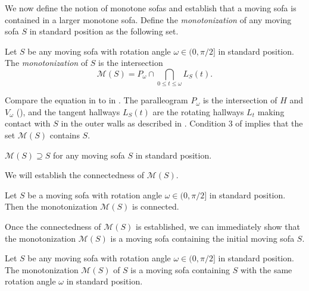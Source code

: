 We now define the notion of monotone sofas and establish  that a moving sofa is contained in a larger monotone sofa. Define the \emph{monotonization} of any moving sofa \(S\) in standard position as the following set.

\begin{definition}

Let \(S\) be any moving sofa with rotation angle \(\omega \in (0, \pi/2]\) in standard position. The \emph{monotonization} of \(S\) is the intersection
\[
\mathcal{M}(S) = P_\omega \cap \bigcap_{0 \leq t \leq \omega} L_S(t).
\]

\label{def:monotonization}
\end{definition}

Compare the equation in  to  in . The paralleogram \(P_\omega\) is the intersection of \(H\) and \(V_\omega\) (), and the tangent hallways \(L_S(t)\) are the rotating hallways \(L_t\) making contact with \(S\) in the outer walls as described in . Condition 3 of  implies that the set \(\mathcal{M}(S)\) contains \(S\).

\begin{corollary}

\(\mathcal{M}(S) \supseteq S\) for any moving sofa \(S\) in standard position.

\label{cor:monotonization-is-larger}
\end{corollary}

We will establish the connectedness of \(\mathcal{M}(S)\).

\begin{theorem}

Let \(S\) be a moving sofa with rotation angle \(\omega \in (0, \pi/2]\) in standard position. Then the monotonization \(\mathcal{M}(S)\) is connected.

\label{thm:monotonization-is-connected}
\end{theorem}

Once the connectedness of \(\mathcal{M}(S)\) is established, we can immediately show that the monotonization \(\mathcal{M}(S)\) is a moving sofa containing the initial moving sofa \(S\).

\begin{theorem}

Let \(S\) be any moving sofa with rotation angle \(\omega \in (0, \pi/2]\) in standard position. The monotonization \(\mathcal{M}(S)\) of \(S\) is a moving sofa containing \(S\) with the same rotation angle \(\omega\) in standard position.

\label{thm:monotonization-is-sofa}
\end{theorem}

